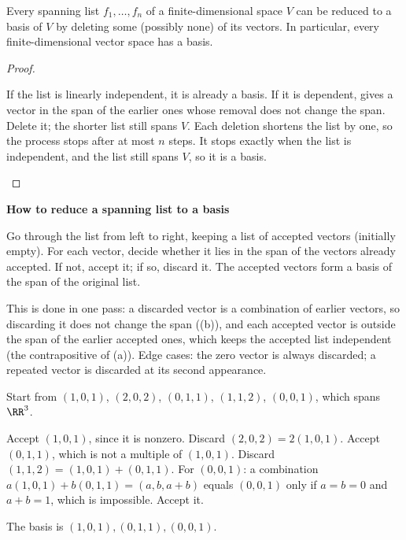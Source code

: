 \documentclass[10pt]{scrartcl}
\newenvironment{methodbox}[1]{\begin{mdframed}[style=methodstyle]\textbf{\color{NavyBlue}#1}\par\vspace{2pt}}{\end{mdframed}}
\begin{document}
\begin{proposition*}
  Every spanning list $f_1,\dots,f_n$ of a finite-dimensional space $V$ can be reduced to a basis of $V$ by deleting some (possibly none) of its vectors. In particular, every finite-dimensional vector space has a basis.
\end{proposition*}
\begin{proof}
  \begin{steps}
    \ii If the list is linearly independent, it is already a basis.
    \ii If it is dependent,  gives a vector in the span of the earlier ones whose removal does not change the span. Delete it; the shorter list still spans $V$.
    \ii Each deletion shortens the list by one, so the process stops after at most $n$ steps. It stops exactly when the list is independent, and the list still spans $V$, so it is a basis.
  \end{steps}
\end{proof}

\begin{methodbox}{How to reduce a spanning list to a basis}
  \begin{steps}
    \ii Go through the list from left to right, keeping a list of accepted vectors (initially empty).
    \ii For each vector, decide whether it lies in the span of the vectors already accepted. If not, accept it; if so, discard it.
    \ii The accepted vectors form a basis of the span of the original list.
  \end{steps}
  This is  done in one pass: a discarded vector is a combination of earlier vectors, so discarding it does not change the span ((b)), and each accepted vector is outside the span of the earlier accepted ones, which keeps the accepted list independent (the contrapositive of (a)). Edge cases: the zero vector is always discarded; a repeated vector is discarded at its second appearance.
\end{methodbox}

\begin{example*}
  Start from $(1,0,1)$, $(2,0,2)$, $(0,1,1)$, $(1,1,2)$, $(0,0,1)$, which spans $\RR^3$.
  \begin{steps}
    \ii Accept $(1,0,1)$, since it is nonzero.
    \ii Discard $(2,0,2)=2(1,0,1)$.
    \ii Accept $(0,1,1)$, which is not a multiple of $(1,0,1)$.
    \ii Discard $(1,1,2)=(1,0,1)+(0,1,1)$.
    \ii For $(0,0,1)$: a combination $a(1,0,1)+b(0,1,1)=(a,b,a+b)$ equals $(0,0,1)$ only if $a=b=0$ and $a+b=1$, which is impossible. Accept it.
  \end{steps}
  The basis is $(1,0,1),(0,1,1),(0,0,1)$.
\end{example*}
\end{document}
